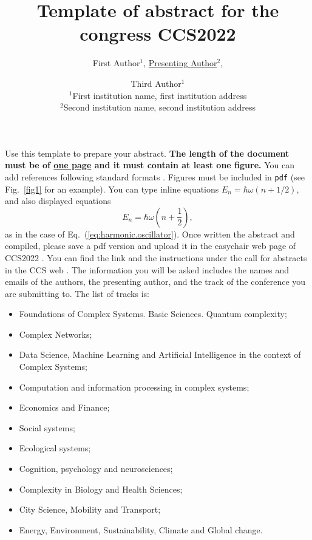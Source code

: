 \documentclass[a4paper]{article}
\begin{document}
\title{Template of abstract for the congress CCS2022}

\author{
First Author$^1$,
\underline{Presenting Author}$^2$,	%
\and
Third Author$^1$
\\
$^1$First institution name, first institution address
\\
$^2$Second institution name, second institution address
}
\maketitle


Use this template to prepare your abstract.
{\bf The length of the document must be of \underline{one page} and it must contain at least one figure.}  
You can add references following standard formats \cite{journal.cite,book.cite}.
Figures must be included in \texttt{pdf} (see Fig.~\ref{fig1} for an example).
You can type inline equations $E_n = \hbar\omega(n + 1/2)$, and also displayed equations
\begin{equation}
E_n = \hbar\omega\left( n + \frac{1}{2} \right),
\label{eq:harmonic.oscillator}
\end{equation}
as in the case of Eq.~(\ref{eq:harmonic.oscillator}).
Once written the abstract and compiled, please save a pdf version and upload it in the easychair web page of CCS2022 \cite{easy}. You can find the link and the instructions under the call for abstracts in the CCS web \cite{web}. The information you will be asked includes the names and emails of the authors, the presenting author, and the track of the conference you are submitting to. The list of tracks is:
\begin{itemize}
\setlength\itemsep{-0.4em}
\item Foundations of Complex Systems. Basic Sciences. Quantum complexity;
\item Complex Networks;
\item Data Science, Machine Learning and Artificial Intelligence in the context of Complex Systems;
\item Computation and information processing in complex systems;
\item Economics and Finance;
\item Social systems;
\item Ecological systems;
\item Cognition, psychology and neurosciences;
\item Complexity in Biology and Health Sciences;
\item City Science, Mobility and Transport;
\item Energy, Environment, Sustainability, Climate and Global change.
\end{itemize} 
\end{document}
